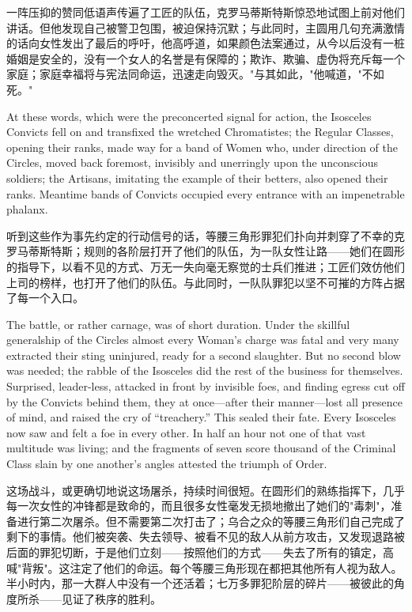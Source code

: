 \documentclass[12pt,UTF8]{ctexbook}
\begin{document}
一阵压抑的赞同低语声传遍了工匠的队伍，克罗马蒂斯特斯惊恐地试图上前对他们讲话。但他发现自己被警卫包围，被迫保持沉默；与此同时，主圆用几句充满激情的话向女性发出了最后的呼吁，他高呼道，如果颜色法案通过，从今以后没有一桩婚姻是安全的，没有一个女人的名誉是有保障的；欺诈、欺骗、虚伪将充斥每一个家庭；家庭幸福将与宪法同命运，迅速走向毁灭。"与其如此，"他喊道，"不如死。"

At these words, which were the preconcerted signal for action, the Isosceles Convicts fell on and transfixed the wretched Chromatistes; the Regular Classes, opening their ranks, made way for a band of Women who, under direction of the Circles, moved back foremost, invisibly and unerringly upon the unconscious soldiers; the Artisans, imitating the example of their betters, also opened their ranks. Meantime bands of Convicts occupied every entrance with an impenetrable phalanx.

听到这些作为事先约定的行动信号的话，等腰三角形罪犯们扑向并刺穿了不幸的克罗马蒂斯特斯；规则的各阶层打开了他们的队伍，为一队女性让路——她们在圆形的指导下，以看不见的方式、万无一失向毫无察觉的士兵们推进；工匠们效仿他们上司的榜样，也打开了他们的队伍。与此同时，一队队罪犯以坚不可摧的方阵占据了每一个入口。

The battle, or rather carnage, was of short duration. Under the skillful generalship of the Circles almost every Woman's charge was fatal and very many extracted their sting uninjured, ready for a second slaughter. But no second blow was needed; the rabble of the Isosceles did the rest of the business for themselves. Surprised, leader-less, attacked in front by invisible foes, and finding egress cut off by the Convicts behind them, they at once---after their manner---lost all presence of mind, and raised the cry of ``treachery.'' This sealed their fate. Every Isosceles now saw and felt a foe in every other. In half an hour not one of that vast multitude was living; and the fragments of seven score thousand of the Criminal Class slain by one another's angles attested the triumph of Order.

这场战斗，或更确切地说这场屠杀，持续时间很短。在圆形们的熟练指挥下，几乎每一次女性的冲锋都是致命的，而且很多女性毫发无损地撤出了她们的"毒刺"，准备进行第二次屠杀。但不需要第二次打击了；乌合之众的等腰三角形们自己完成了剩下的事情。他们被突袭、失去领导、被看不见的敌人从前方攻击，又发现退路被后面的罪犯切断，于是他们立刻——按照他们的方式——失去了所有的镇定，高喊"背叛"。这注定了他们的命运。每个等腰三角形现在都把其他所有人视为敌人。半小时内，那一大群人中没有一个还活着；七万多罪犯阶层的碎片——被彼此的角度所杀——见证了秩序的胜利。
\end{document}

